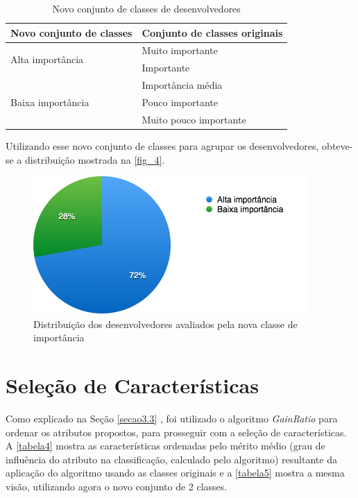 
\begin{table}[h]
	\centering
	\caption{Novo conjunto de classes de desenvolvedores}
	\label{tabela3}
	\def\arraystretch{1.5}
	\begin{tabular}{|p{6cm}|p{8.5cm}|}
		\hline
		\textbf{Novo conjunto de classes}  & \textbf{Conjunto de classes originais} \\ \hline
		\multirow{2}{*}{Alta importância}  & Muito importante                       \\ \cline{2-2} 
		& Importante                             \\ \hline
		\multirow{3}{*}{Baixa importância} & Importância média                      \\ \cline{2-2} 
		& Pouco importante                       \\ \cline{2-2} 
		& Muito pouco importante                 \\ \hline
	\end{tabular}
\end{table}

Utilizando esse novo conjunto de classes para agrupar os desenvolvedores, obteve-se a distribuição mostrada na \autoref{fig_4}.

\begin{figure}[h]
	\centering
	\includegraphics[scale=0.8]{figs/geral/imagem-classe-alternativa.png}
	\caption{\label{fig_4}Distribuição dos desenvolvedores avaliados pela nova classe de importância}
\end{figure}

\section{Seleção de Características}\label{secao4.3}

Como explicado na Seção \ref{secao3.3} , foi utilizado o algoritmo \textit{GainRatio} para ordenar os atributos propostos, para prosseguir com a seleção de características. A \autoref{tabela4} mostra as características ordenadas pelo mérito médio (grau de influência do atributo na classificação, calculado pelo algoritmo) resultante da aplicação do algoritmo usando as classes originais e a \autoref{tabela5} mostra a mesma visão, utilizando agora o novo conjunto de 2 classes. 


